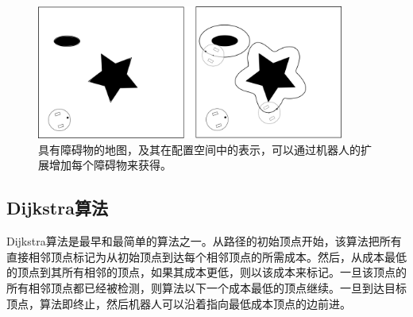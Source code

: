 \begin{figure}[!htb]
\centering
\includegraphics[width=0.9\textwidth]{figs/configurationspace}
\caption{具有障碍物的地图，及其在配置空间中的表示，可以通过机器人的扩展增加每个障碍物来获得。 \label{fig:cspace}}
\end{figure}


\subsection{Dijkstra算法}

Dijkstra算法是最早和最简单的算法之一\cite{dijkstra1959note}。从路径的初始顶点开始，该算法把所有直接相邻顶点标记为从初始顶点到达每个相邻顶点的所需成本。然后，从成本最低的顶点到其所有相邻的顶点，如果其成本更低，则以该成本来标记。一旦该顶点的所有相邻顶点都已经被检测，则算法以下一个成本最低的顶点继续。一旦到达目标顶点，算法即终止，然后机器人可以沿着指向最低成本顶点的边前进。

